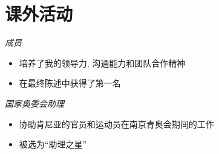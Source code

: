 \section{课外活动}
\textit{成员}
\begin{itemize}
  \item 培养了我的领导力, 沟通能力和团队合作精神
  \item 在最终陈述中获得了第一名
\end{itemize}

\textit{国家奥委会助理}
\begin{itemize}
  \item 协助肯尼亚的官员和运动员在南京青奥会期间的工作
  \item 被选为``助理之星''
\end{itemize}